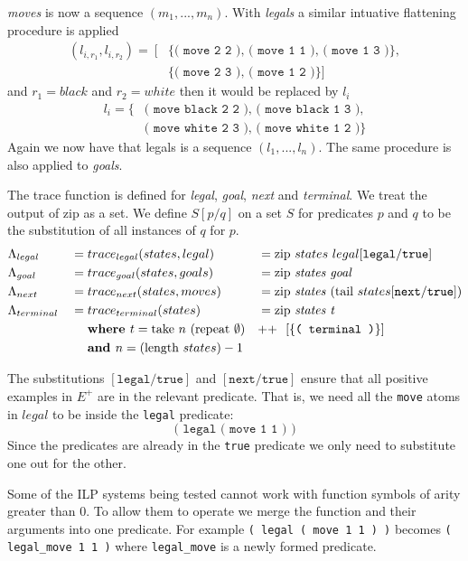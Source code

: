 \textit{moves} is now a sequence $(m_1,...,m_n)$. With \textit{legals} a similar intuative flattening procedure is applied
\begin{align*}
(l_{i,r_1},l_{i,r_2}) =\ [&\{\texttt{( move 2 2 ), ( move 1 1 ), ( move 1 3 )}\}, \\
&\{\texttt{( move 2 3 ), ( move 1 2 )}\}]
\end{align*}
and $r_1 = black$ and $r_2 = white$ then it would be replaced by $l_i$
\begin{align*}
l_i = \{&\texttt{( move black 2 2 ), ( move black 1 3 ),}\\ &\texttt{( move white 2 3 ), ( move white 1 2 )}\}
\end{align*}
Again we now have that legals is a sequence $(l_1,...,l_n)$. The same procedure is also applied to \textit{goals}.


The trace function is defined for \textit{legal}, \textit{goal}, \textit{next} and \textit{terminal}. We treat the output of zip as a set. We define $S[p/q]$ on a set $S$ for predicates $p$ and $q$ to be the substitution of all instances of $q$ for $p$. 
\begin{align*}
&\Lambda_{legal} &&= trace_{legal}(states,legal) &&= \text{zip } states\ legal[\texttt{legal}/\texttt{true}] \\
&\Lambda_{goal} &&= trace_{goal}(states,goals) &&= \text{zip \textit{states goal}} \\
&\Lambda_{next} &&= trace_{next}(states,moves) &&= \text{zip \textit{states} } \text{(tail }states[\texttt{next}/\texttt{true}]) \\
&\Lambda_{terminal} &&= trace_{terminal}(states) &&= \text{zip \textit{states t}} \\
&&&\ \ \ \ \textbf{where  } t =\text{take } n\ (\text{repeat } \emptyset ) &&\text{++}\ \ [\{\texttt{( terminal )}\}] \\
&&&\ \ \ \ \textbf{and } n = (\text{length }states) - 1 &&
\end{align*}

The substitutions $[\texttt{legal}/\texttt{true}]$ and $[\texttt{next}/\texttt{true}]$ ensure that all positive examples in $E^+$ are in the relevant predicate. That is, we need all the \texttt{move} atoms in $legal$ to be inside the \texttt{legal} predicate:
\[\texttt{( legal ( move 1 1 ) )}\]
Since the predicates are already in the \texttt{true} predicate we only need to substitute one out for the other.

Some of the ILP systems being tested cannot work with function symbols of arity greater than 0. To allow them to operate we merge the function and their arguments into one predicate. For example \texttt{( legal ( move 1 1 ) )} becomes \verb|( legal_move 1 1 )| where \verb|legal_move| is a newly formed predicate.

